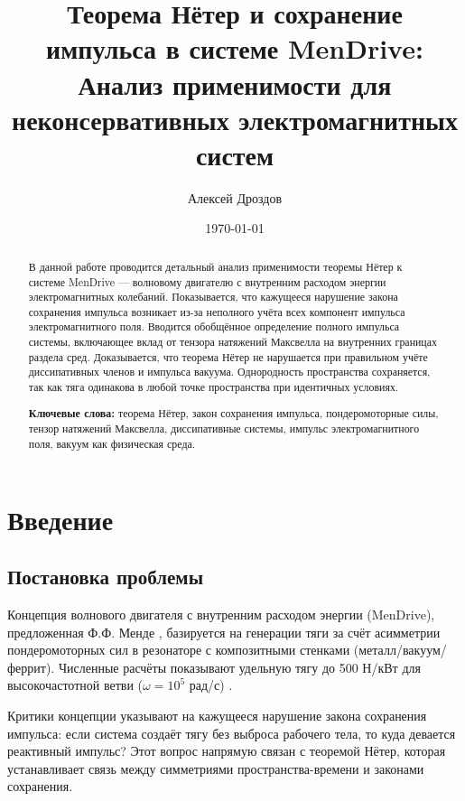 \documentclass[a4paper,12pt]{article}
\title{Теорема Нётер и сохранение импульса в системе MenDrive:\\
Анализ применимости для неконсервативных электромагнитных систем}
\author{Алексей Дроздов}
\date{\today}
\begin{document}
\maketitle

\begin{abstract}
В данной работе проводится детальный анализ применимости теоремы Нётер
к системе MenDrive --- волновому двигателю с внутренним расходом энергии
электромагнитных колебаний. Показывается, что кажущееся нарушение закона
сохранения импульса возникает из-за неполного учёта всех компонент импульса
электромагнитного поля. Вводится обобщённое определение полного импульса
системы, включающее вклад от тензора натяжений Максвелла на внутренних
границах раздела сред. Доказывается, что теорема Нётер не нарушается при
правильном учёте диссипативных членов и импульса вакуума. Однородность
пространства сохраняется, так как тяга одинакова в любой точке пространства
при идентичных условиях.

\textbf{Ключевые слова:} теорема Нётер, закон сохранения импульса,
пондеромоторные силы, тензор натяжений Максвелла, диссипативные системы,
импульс электромагнитного поля, вакуум как физическая среда.
\end{abstract}

\tableofcontents
\newpage

\section{Введение}

\subsection{Постановка проблемы}

Концепция волнового двигателя с внутренним расходом энергии (MenDrive),
предложенная Ф.Ф. Менде \cite{Mende}, базируется на генерации тяги за счёт
асимметрии пондеромоторных сил в резонаторе с композитными стенками
(металл/вакуум/феррит). Численные расчёты показывают удельную тягу до
500 Н/кВт для высокочастотной ветви ($\omega = 10^5$ рад/с) \cite{MenDriveReal}.

Критики концепции указывают на кажущееся нарушение закона сохранения
импульса: если система создаёт тягу без выброса рабочего тела, то куда
девается реактивный импульс? Этот вопрос напрямую связан с теоремой Нётер,
которая устанавливает связь между симметриями пространства-времени и
законами сохранения.
\end{document}
